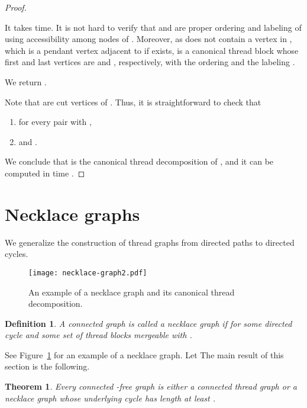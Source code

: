 \documentclass[11pt]{article}
\newtheorem{theorem}{Theorem}[section]
\newtheorem{definition}{Definition}[section]
\theoremstyle{remark}
\begin{document}
\begin{proof}
\begin{enumerate}
It takes  time.
It is not hard to verify that  and  are proper ordering and labeling of  using accessibility among nodes of . Moreover,  as  does not contain a vertex  in , which is a pendant vertex adjacent to  if exists, 
 is a canonical thread block whose first and last vertices are  and , respectively, with the ordering  and the labeling .

We return .
\end{enumerate}


Note that  are cut vertices of . Thus, it is straightforward to check that
\begin{enumerate}[(1)]
\item  for every pair  with , 
\item   and .
\end{enumerate} 
We conclude that  is the canonical thread decomposition of , and it can be computed in time .
\end{proof}








\section{Necklace graphs}\label{sec:necklacegraph}
We generalize the construction of thread graphs from directed paths to directed cycles.

\begin{figure}
\centerline{\texttt{[image: necklace-graph2.pdf]}}

\caption{An example of a necklace graph and its canonical thread decomposition.}
\label{fig:necklace}
\end{figure}



\begin{definition}
A connected graph  is called a \emph{necklace graph} if  for some directed cycle  and 
some set of thread blocks  mergeable with . 
\end{definition}

See Figure~\ref{fig:necklace} for an example of a necklace graph.
Let  The main result of this section is the following.

\begin{theorem}\label{thm:mainlrw}
Every connected -free graph is either a connected thread graph or a necklace graph whose underlying cycle has length at least .
\end{theorem}
\end{document}
